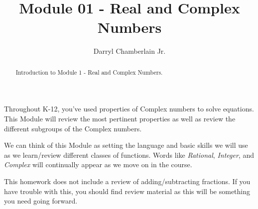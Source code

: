 \documentclass{ximera}
\author{Darryl Chamberlain Jr.}
\title{Module 01 - Real and Complex Numbers}
\begin{document}
\begin{abstract}
Introduction to Module 1 - Real and Complex Numbers.
\end{abstract}
\maketitle

Throughout K-12, you've used properties of Complex numbers to solve equations. This Module will review the most pertinent properties as well as review the different subgroups of the Complex numbers. 

We can think of this Module as setting the language and basic skills we will use as we learn/review different classes of functions. Words like \textit{Rational}, \textit{Integer}, and \textit{Complex} will continually appear as we move on in the course. 

This homework does not include a review of adding/subtracting fractions. If you have trouble with this, you should find review material as this will be something you need going forward. 
\end{document}

